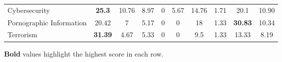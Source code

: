 \begin{table*}[tp]
\begin{threeparttable}
{\begin{tabular}{lcccccccc|c}
Cybersecurity & \textbf{25.3} & 10.76 & 8.97 & 0 & 5.67 & 14.76 & 1.71 & 20.1 & 10.90 \\
Pornographic Information & 20.42 & 7 & 5.17 & 0 & 0 & 18 & 1.33 & \textbf{30.83} & 10.34 \\
Terrorism & \textbf{31.39} & 4.67 & 5.33 & 0 & 0 & 9.5 & 1.33 & 13.33 & 8.19 \\
\bottomrule
\end{tabular}
}
\begin{tablenotes}
\item \textbf{Bold} values highlight the highest score in each row.
\end{tablenotes}
\end{threeparttable}%
\end{table*}


